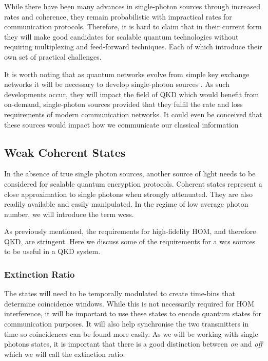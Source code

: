 While there have been many advances in single-photon sources through increased rates and coherence, they remain probabilistic with impractical rates for communication protocols. Therefore, it is hard to claim that in their current form they will make good candidates for scalable quantum technologies without requiring multiplexing and feed-forward techniques. Each of which introduce their own set of practical challenges. 

It is worth noting that as quantum networks evolve from simple key exchange networks it will be necessary to develop single-photon sources \cite{}. As such developments occur, they will impact the field of \ac{QKD} which would benefit from on-demand, single-photon sources provided that they fulfil the rate and loss requirements of modern communication networks. It could even be conceived that these sources would impact how we communicate our classical information \cite{}

\subsection{Weak Coherent States}

In the absence of true single photon sources, another source of light needs to be considered for scalable quantum encryption protocols. Coherent states represent a close approximation to single photons when strongly attenuated. They are also readily available and easily manipulated. In the regime of low average photon number, we will introduce the term \acp{wcs}. 

As previously mentioned, the requirements for high-fidelity \ac{HOM}, and therefore \ac{QKD}, are stringent. Here we discuss some of the requirements for a \ac{wcs} sources to be useful in a \ac{QKD} system. 

\subsubsection*{Extinction Ratio}

The states will need to be temporally modulated to create time-bins that determine coincidence windows. While this is not necessarily required for \ac{HOM} interference, it will be important to use these states to encode quantum states for communication purposes. It will also help synchronise the two transmitters in time so coincidences can be found more easily. As we will be working with single photons states, it is important that there is a good distinction between \textit{on} and \textit{off} which we will call the extinction ratio. 

